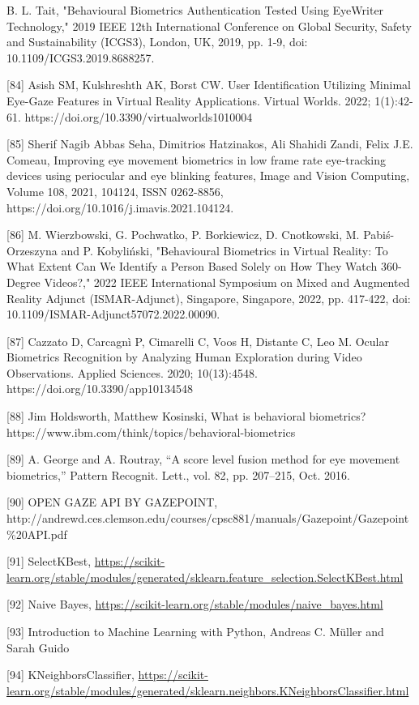 \documentclass{article}
\begin{document}
\begin{raggedright}
[83] B. L. Tait, "Behavioural Biometrics Authentication Tested Using EyeWriter Technology," 2019 IEEE 12th International Conference on Global Security, Safety and Sustainability (ICGS3), London, UK, 2019, pp. 1-9, doi: 10.1109/ICGS3.2019.8688257.

[84] Asish SM, Kulshreshth AK, Borst CW. User Identification Utilizing Minimal Eye-Gaze Features in Virtual Reality Applications. Virtual Worlds. 2022; 1(1):42-61. https://doi.org/10.3390/virtualworlds1010004

[85] Sherif Nagib Abbas Seha, Dimitrios Hatzinakos, Ali Shahidi Zandi, Felix J.E. Comeau, Improving eye movement biometrics in low frame rate eye-tracking devices using periocular and eye blinking features, Image and Vision Computing, Volume 108, 2021, 104124, ISSN 0262-8856, https://doi.org/10.1016/j.imavis.2021.104124.

[86] M. Wierzbowski, G. Pochwatko, P. Borkiewicz, D. Cnotkowski, M. Pabiś-Orzeszyna and P. Kobyliński, "Behavioural Biometrics in Virtual Reality: To What Extent Can We Identify a Person Based Solely on How They Watch 360-Degree Videos?," 2022 IEEE International Symposium on Mixed and Augmented Reality Adjunct (ISMAR-Adjunct), Singapore, Singapore, 2022, pp. 417-422, doi: 10.1109/ISMAR-Adjunct57072.2022.00090.

[87] Cazzato D, Carcagnì P, Cimarelli C, Voos H, Distante C, Leo M. Ocular Biometrics Recognition by Analyzing Human Exploration during Video Observations. Applied Sciences. 2020; 10(13):4548. https://doi.org/10.3390/app10134548

[88] Jim Holdsworth, Matthew Kosinski, What is behavioral biometrics? https://www.ibm.com/think/topics/behavioral-biometrics

[89] A. George and A. Routray, “A score level fusion method for eye movement biometrics,” Pattern Recognit. Lett., vol. 82, pp. 207–215, Oct. 2016.

[90] OPEN GAZE API BY GAZEPOINT, http://andrewd.ces.clemson.edu/courses/cpsc881/manuals/Gazepoint/Gazepoint\%20API.pdf

[91] SelectKBest, \url{https://scikit-learn.org/stable/modules/generated/sklearn.feature_selection.SelectKBest.html}

[92] Naive Bayes, \url{https://scikit-learn.org/stable/modules/naive_bayes.html}

[93] Introduction to Machine Learning with Python, Andreas C. Müller and Sarah Guido

[94] KNeighborsClassifier, \url{https://scikit-learn.org/stable/modules/generated/sklearn.neighbors.KNeighborsClassifier.html}


\end{raggedright}
\end{document}
